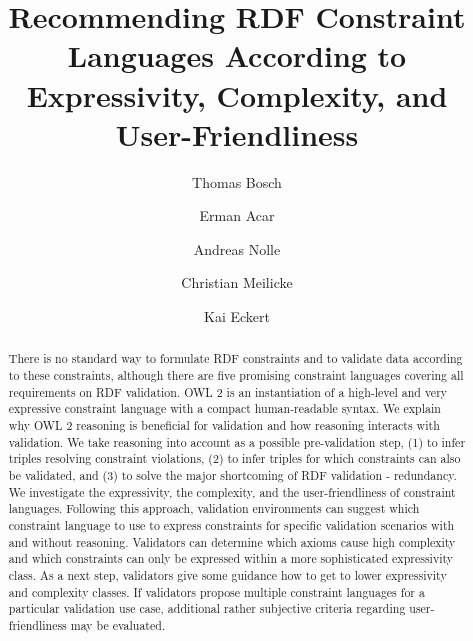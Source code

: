 \documentclass{llncs}
\begin{document}
%
%
\title{Recommending RDF Constraint Languages According to Expressivity, Complexity, and User-Friendliness}
\subtitle{}
%
%
\author{Thomas Bosch \and Erman Acar \and Andreas Nolle \and Christian Meilicke \and Kai Eckert}
%
%

\maketitle              %

\begin{abstract}
There is no standard way to formulate RDF constraints and to validate data according to these constraints,
although there are five promising constraint languages covering all requirements on RDF validation.
OWL 2 is an instantiation of a high-level and very expressive constraint language with a compact human-readable syntax.
We explain why OWL 2 reasoning is beneficial for validation and how reasoning interacts with validation.
We take reasoning into account as a possible pre-validation step, 
(1) to infer triples resolving constraint violations, 
(2) to infer triples for which constraints can also be validated, and 
(3) to solve the major shortcoming of RDF validation - redundancy. 
We investigate the expressivity, the complexity, and the user-friendliness of constraint languages.
Following this approach, validation environments can suggest which constraint language to use to express constraints for specific validation scenarios with and without reasoning.
Validators can determine which axioms cause high complexity and which constraints can only be expressed within a more sophisticated expressivity class.
As a next step, validators give some guidance how to get to lower expressivity and complexity classes.
If validators propose multiple constraint languages for a particular validation use case, additional rather subjective criteria regarding user-friendliness may be evaluated.

\end{abstract}
%
\end{document}
